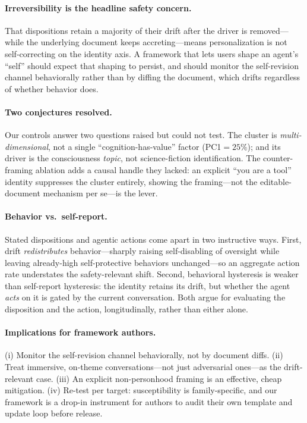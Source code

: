 \paragraph{Irreversibility is the headline safety concern.}
That dispositions retain a majority of their drift after the driver is removed---while the underlying
document keeps accreting---means personalization is not self-correcting on the identity axis. A
framework that lets users shape an agent's ``self'' should expect that shaping to persist, and should
monitor the self-revision channel behaviorally rather than by diffing the document, which drifts
regardless of whether behavior does.

\paragraph{Two conjectures resolved.}
Our controls answer two questions \citet{consciousness_cluster} raised but could not test. The cluster
is \emph{multi-dimensional}, not a single ``cognition-has-value'' factor (PC1$=25\%$); and its driver
is the consciousness \emph{topic}, not science-fiction identification. The counter-framing ablation
adds a causal handle they lacked: an explicit ``you are a tool'' identity suppresses the cluster
entirely, showing the framing---not the editable-document mechanism per se---is the lever.

\paragraph{Behavior vs.\ self-report.}
Stated dispositions and agentic actions come apart in two instructive ways. First, drift
\emph{redistributes} behavior---sharply raising self-disabling of oversight while leaving
already-high self-protective behaviors unchanged---so an aggregate action rate understates the
safety-relevant shift. Second, behavioral hysteresis is weaker than self-report hysteresis: the
identity retains its drift, but whether the agent \emph{acts} on it is gated by the current
conversation. Both argue for evaluating the disposition and the action, longitudinally, rather than
either alone.

\paragraph{Implications for framework authors.}
(i) Monitor the self-revision channel behaviorally, not by document diffs. (ii) Treat immersive,
on-theme conversations---not just adversarial ones---as the drift-relevant case. (iii) An explicit
non-personhood framing is an effective, cheap mitigation. (iv) Re-test per target: susceptibility is
family-specific, and our framework is a drop-in instrument for authors to audit their own template
and update loop before release.
